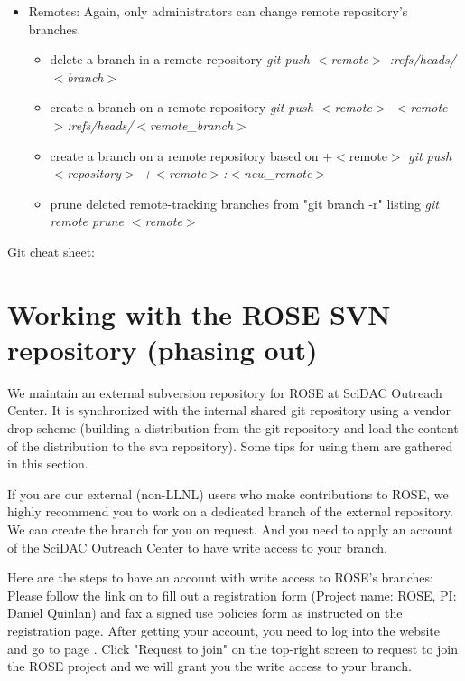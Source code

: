 \begin{itemize}
\item Remotes: Again, only administrators can change remote repository's branches.
   \begin{itemize}
       \item delete a branch in a remote repository \textit{git push $<$remote$>$ :refs/heads/$<$branch$>$}
       \item create a branch on a remote repository \textit{git push $<$remote$>$ $<$remote$>$:refs/heads/$<$remote\_branch$>$}
       \item create a branch on a remote repository based on +$<$remote$>$ \textit{git push $<$repository$>$ +$<$remote$>$:$<$new\_remote$>$}
       \item prune deleted remote-tracking branches from "git branch -r" listing \textit{ git remote prune $<$remote$>$ }
   \end{itemize}
\end{itemize}
Git cheat sheet: 



\section{Working with the ROSE SVN repository (phasing out)}%
  \label{gettingStarted::svn}
  We maintain an external subversion repository for ROSE at SciDAC Outreach
    Center. It is synchronized with the internal shared git repository using a
    vendor drop scheme (building a distribution from the git repository and
        load the content of the distribution to the svn repository). 
    Some tips for using them are gathered in this section. 

    If you are our external (non-LLNL) users who make contributions to ROSE,
       we highly recommend you to work on a dedicated branch of the external repository. 
         We can create the branch for you on request. And you need to apply an account of
         the SciDAC Outreach Center to have write access to your branch. 

         Here are the steps to have an account with write access to ROSE's branches:
         Please follow the link on
  to fill out a registration form (Project name: ROSE, PI: Daniel Quinlan)
    and fax a signed use policies form as instructed on the registration page.
    After getting your account, you need to log into the website and go to page
    .
    Click "Request to join" on the top-right screen to request to join the ROSE
    project and we will grant you the write access to your branch. 

